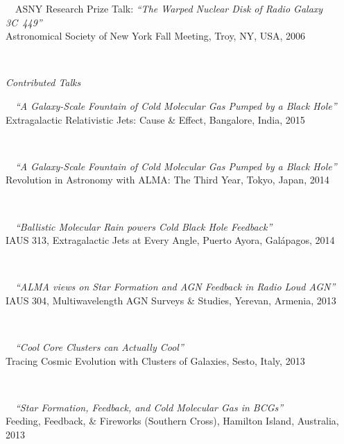 \documentclass[11pt]{article}
\begin{document}
\hspace{42mm} \parbox{5.15in}{
\textbullet~~ASNY Research Prize Talk: \textit{``The Warped Nuclear Disk of Radio Galaxy 3C~449''}\\ Astronomical Society of New York Fall Meeting, Troy, NY, USA, 2006}\\




\vspace{4mm}



\hspace{2.5mm} \parbox{1.5in}{\textit{Contributed Talks}\\} \parbox{5.15in}{
\textbullet~~\textit{``A Galaxy-Scale Fountain of Cold Molecular Gas Pumped by a Black Hole''} \\
Extragalactic Relativistic Jets: Cause \& Effect, Bangalore, India, 2015}\\


\hspace{42mm} \parbox{5.15in}{
\textbullet~~\textit{``A Galaxy-Scale Fountain of Cold Molecular Gas Pumped by a Black Hole''} \\
Revolution in Astronomy with ALMA: The Third Year, Tokyo, Japan, 2014}\\


\hspace{42mm} \parbox{5.15in}{
\textbullet~~\textit{``Ballistic Molecular Rain powers Cold Black Hole Feedback''} \\
IAUS 313, Extragalactic Jets at Every Angle, Puerto Ayora, Gal\'{a}pagos, 2014}\\

\hspace{42mm} \parbox{5.15in}{
\textbullet~~\textit{``ALMA views on Star Formation and AGN Feedback in Radio Loud AGN''} \\
IAUS 304, Multiwavelength AGN Surveys \& Studies, Yerevan, Armenia, 2013}\\


\hspace{42mm} \parbox{5.15in}{
\textbullet~~\textit{``Cool Core Clusters can Actually Cool''} \\ Tracing Cosmic Evolution with Clusters of Galaxies, Sesto, Italy, 2013} \\


\hspace{42mm} \parbox{5.15in}{
\textbullet~~\textit{``Star Formation, Feedback, and Cold Molecular Gas in BCGs''} \\ Feeding, Feedback, \& Fireworks (Southern Cross), Hamilton Island, Australia, 2013} \\
\end{document}
